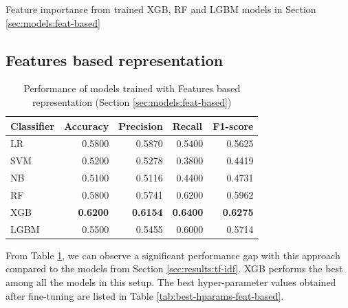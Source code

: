 \begin{landscape}
\begin{table}[!h]
    {Feature importance from trained \ac{XGB}, \ac{RF} and \ac{LGBM} models in Section \ref{sec:models:feat-based}}
    \label{tab:best-hparams-tf-based-tfidf-vect}
\end{table}

\vfill
\clearpage
\end{landscape}


\subsection{Features based representation}
\label{sec:results:feat-extr}

\begin{table}[htbp]
\centering
\begin{tabular}{lrrrr}
\hline
\textbf{Classifier} & \multicolumn{1}{l}{\textbf{Accuracy}} & \multicolumn{1}{l}{\textbf{Precision}} & \multicolumn{1}{l}{\textbf{Recall}} & \multicolumn{1}{l}{\textbf{F1-score}} \\ \hline
LR & 0.5800 & 0.5870 & 0.5400 & 0.5625 \\
SVM & 0.5200 & 0.5278 & 0.3800 & 0.4419 \\
NB & 0.5100 & 0.5116 & 0.4400 & 0.4731 \\
RF & 0.5800 & 0.5741 & 0.6200 & 0.5962 \\
XGB & \textbf{0.6200} & \textbf{0.6154} & \textbf{0.6400} & \textbf{0.6275} \\
LGBM & 0.5500 & 0.5455 & 0.6000 & 0.5714 \\ \hline
\end{tabular}
\caption{Performance of models trained with Features based representation (Section \ref{sec:models:feat-based})}
\label{tab:results:performance-feat-based}
\end{table}

From Table \ref{tab:results:performance-feat-based}, we can observe a significant performance gap with this approach compared to the models from Section \ref{sec:results:tf-idf}. \ac{XGB} performs the best among all the models in this setup. The best hyper-parameter values obtained after fine-tuning are listed in Table \ref{tab:best-hparams-feat-based}.


